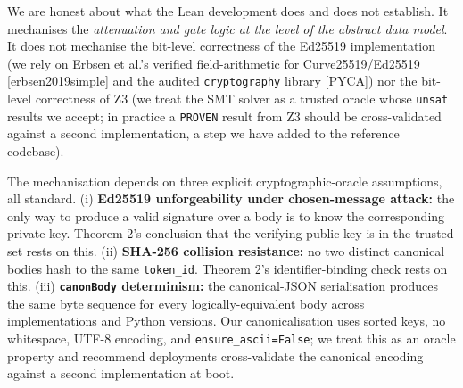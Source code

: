 We are honest about what the Lean development does and does not
establish. It mechanises the \emph{attenuation and gate logic at the
level of the abstract data model}. It does not mechanise the bit-level
correctness of the Ed25519 implementation (we rely on Erbsen et al.'s
verified field-arithmetic for Curve25519/Ed25519 {[}erbsen2019simple{]}
and the audited \texttt{cryptography} library {[}PYCA{]}) nor the
bit-level correctness of Z3 (we treat the SMT solver as a trusted oracle
whose \texttt{unsat} results we accept; in practice a \texttt{PROVEN}
result from Z3 should be cross-validated against a second
implementation, a step we have added to the reference codebase).

The mechanisation depends on three explicit cryptographic-oracle
assumptions, all standard. (i) \textbf{Ed25519 unforgeability under
chosen-message attack:} the only way to produce a valid signature over a
body is to know the corresponding private key. Theorem 2's conclusion
that the verifying public key is in the trusted set rests on this. (ii)
\textbf{SHA-256 collision resistance:} no two distinct canonical bodies
hash to the same \texttt{token\_id}. Theorem 2's identifier-binding
check rests on this. (iii) \textbf{\texttt{canonBody} determinism:} the
canonical-JSON serialisation produces the same byte sequence for every
logically-equivalent body across implementations and Python versions.
Our canonicalisation uses sorted keys, no whitespace, UTF-8 encoding,
and \texttt{ensure\_ascii=False}; we treat this as an oracle property
and recommend deployments cross-validate the canonical encoding against
a second implementation at boot.
